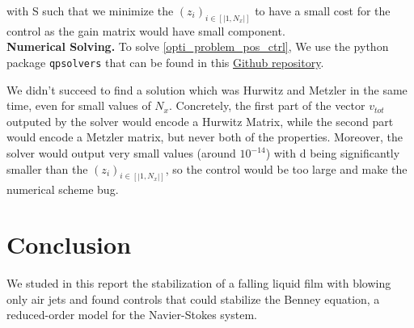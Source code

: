 \documentclass[12pt]{article}
\begin{document}
with S such that we minimize the $(z_i)_{i\in[|1,N_x|]}$ to have a small cost for the control as the gain matrix would have small component.\\


\textbf{Numerical Solving.} To solve \eqref{opti_problem_pos_ctrl}, We use the python package \texttt{qpsolvers} that can be found in this \href{https://github.com/qpsolvers/qpsolvers}{Github repository}. 

We didn't succeed to find a solution which was Hurwitz and Metzler in the same time, even for small values of $N_x$. Concretely, the first part of the vector $v_{tot}$  outputed by the solver would encode a Hurwitz Matrix, while the second part would encode a Metzler matrix, but never both of the properties. Moreover, the solver would output very small values (around $10^{-14}$) with d being significantly smaller than the $(z_i)_{i\in[|1,N_x|]}$, so the control would be too large and make the numerical scheme bug. 


\section{Conclusion}

We studed in this report the stabilization of a falling liquid film with blowing
only air jets and found controls that could stabilize the Benney equation, a reduced-order
model for the Navier-Stokes system. 
\end{document}
